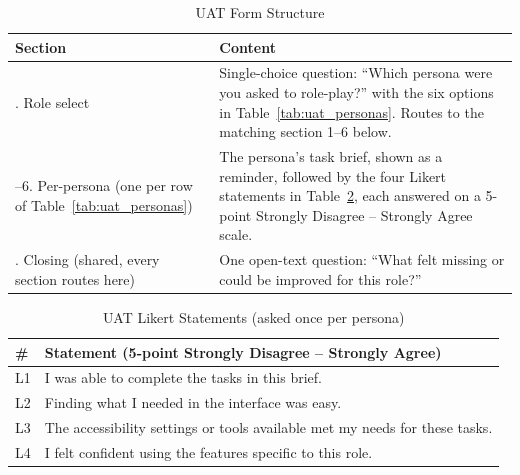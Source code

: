 \documentclass[12pt, oneside]{article} %
\begin{document}
\begin{table}[H]
\caption{UAT Form Structure}
\label{tab:uat_structure}
\vspace{-4mm}
\begin{center}
\renewcommand{\arraystretch}{1.2}
\footnotesize
\begin{tabular}{|>{\raggedright\arraybackslash}p{3.2cm}|>{\raggedright\arraybackslash}p{10.8cm}|}
\hline
\textbf{Section} & \textbf{Content} \\
\hline \hline
0. Role select & Single-choice question: ``Which persona were you asked to role-play?'' with the six options in Table~\ref{tab:uat_personas}. Routes to the matching section 1--6 below. \\ \hline
1--6. Per-persona (one per row of Table~\ref{tab:uat_personas}) & The persona's task brief, shown as a reminder, followed by the four Likert statements in Table~\ref{tab:uat_likert}, each answered on a 5-point Strongly Disagree -- Strongly Agree scale. \\ \hline
7. Closing (shared, every section routes here) & One open-text question: ``What felt missing or could be improved for this role?'' \\ \hline
\end{tabular}
\end{center}
\end{table}

\begin{table}[H]
\caption{UAT Likert Statements (asked once per persona)}
\label{tab:uat_likert}
\vspace{-4mm}
\begin{center}
\renewcommand{\arraystretch}{1.2}
\footnotesize
\begin{tabular}{|>{\raggedright\arraybackslash}p{1.2cm}|>{\raggedright\arraybackslash}p{12.8cm}|}
\hline
\textbf{\#} & \textbf{Statement (5-point Strongly Disagree -- Strongly Agree)} \\
\hline \hline
L1 & I was able to complete the tasks in this brief. \\ \hline
L2 & Finding what I needed in the interface was easy. \\ \hline
L3 & The accessibility settings or tools available met my needs for these tasks. \\ \hline
L4 & I felt confident using the features specific to this role. \\ \hline
\end{tabular}
\end{center}
\end{table}
\end{document}
